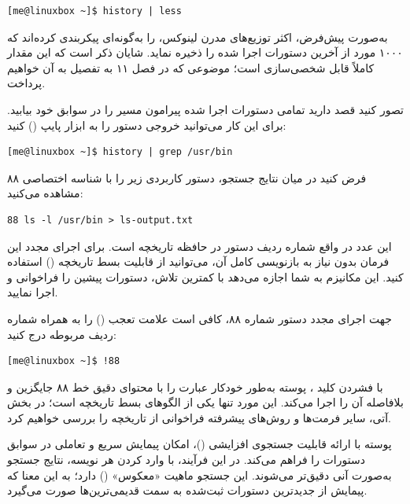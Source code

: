 \begin{latin}
\begin{lstlisting}
[me@linuxbox ~]$ history | less
\end{lstlisting}
\end{latin}

به‌صورت پیش‌فرض، اکثر توزیع‌های مدرن لینوکس،  را به‌گونه‌ای پیکربندی کرده‌اند که ۱۰۰۰ مورد از آخرین دستورات اجرا شده را ذخیره نماید. شایان ذکر است که این مقدار کاملاً قابل شخصی‌سازی است؛ موضوعی که در فصل ۱۱ به تفصیل به آن خواهیم پرداخت.

تصور کنید قصد دارید تمامی دستورات اجرا شده پیرامون مسیر  را در سوابق خود بیابید. برای این کار می‌توانید خروجی دستور  را به ابزار  پایپ () کنید:

\begin{latin}
\begin{lstlisting}
[me@linuxbox ~]$ history | grep /usr/bin
\end{lstlisting}
\end{latin}

فرض کنید در میان نتایج جستجو، دستور کاربردی زیر را با شناسه اختصاصی ۸۸ مشاهده می‌کنید:

\begin{latin}
\begin{lstlisting}
88 ls -l /usr/bin > ls-output.txt
\end{lstlisting}
\end{latin}

این عدد در واقع شماره ردیف دستور در حافظه تاریخچه است. برای اجرای مجدد این فرمان بدون نیاز به بازنویسی کامل آن، می‌توانید از قابلیت بسط تاریخچه () استفاده کنید. این مکانیزم به شما اجازه می‌دهد با کمترین تلاش، دستورات پیشین را فراخوانی و اجرا نمایید.

جهت اجرای مجدد دستور شماره ۸۸، کافی است علامت تعجب (\cmd{!}) را به همراه شماره ردیف مربوطه درج کنید:

\begin{latin}
\begin{lstlisting}
[me@linuxbox ~]$ !88
\end{lstlisting}
\end{latin}

با فشردن کلید ، پوسته  به‌طور خودکار عبارت  را با محتوای دقیق خط ۸۸ جایگزین و بلافاصله آن را اجرا می‌کند. این مورد تنها یکی از الگوهای بسط تاریخچه است؛ در بخش آتی، سایر فرمت‌ها و روش‌های پیشرفته فراخوانی از تاریخچه را بررسی خواهیم کرد.

پوسته  با ارائه قابلیت جستجوی افزایشی ()، امکان پیمایش سریع و تعاملی در سوابق دستورات را فراهم می‌کند. در این فرآیند، با وارد کردن هر نویسه، نتایج جستجو به‌صورت آنی دقیق‌تر می‌شوند. این جستجو ماهیت «معکوس» () دارد؛ به این معنا که پیمایش از جدیدترین دستورات ثبت‌شده به سمت قدیمی‌ترین‌ها صورت می‌گیرد.

